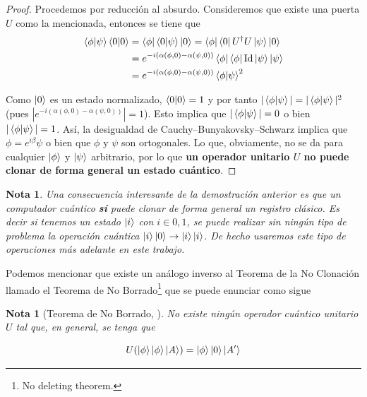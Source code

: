 \documentclass[11pt, spanish]{report}
\numberwithin{equation}{section}
\newtheorem{nota}[defin]{Nota}
\numberwithin{defin}{section}
\begin{document}
\begin{appendices}
\begin{proof}
Procedemos por reducción al absurdo. Consideremos que existe una puerta $U$ como la mencionada, entonces se tiene que
\begin{equation}
\begin{split}
\bra{\phi}\ket{\psi}\bra{0}\ket{0}&=\bra{\phi}\bra{0}\ket{\psi}\ket{0}=\bra{\phi}\bra{0} U^\dag U\ket{\psi}\ket{0} \\
&=e^{-i(\alpha(\phi,0)-\alpha(\psi,0))}\bra{\phi}\bra{\phi}\text{Id}\ket{\psi}\ket{\psi}\\
&=e^{-i(\alpha(\phi,0)-\alpha(\psi,0))}\bra{\phi}\ket{\psi}^2
\end{split}
\end{equation}

Como $\ket{0}$ es un estado normalizado, $\bra{0}\ket{0}=1$ y por tanto $|\bra{\phi}\ket{\psi}|=|\bra{\phi}\ket{\psi}|^2$ (pues $|e^{-i(\alpha(\phi,0)-\alpha(\psi,0))}|=1$). Esto implica que $|\bra{\phi}\ket{\psi}|=0$ o bien $|\bra{\phi}\ket{\psi}|=1$. Así, la desigualdad de Cauchy–Bunyakovsky–Schwarz implica que $\phi=e^{i\beta}\psi$ o bien que $\phi$ y $\psi$ son ortogonales. Lo que, obviamente, no se da para cualquier $\ket{\phi}$ y $\ket{\psi}$ arbitrario, por lo que \textbf{un operador unitario $U$ no puede clonar de forma general un estado cuántico}.
\end{proof}

\begin{nota}
Una consecuencia interesante de la demostración anterior es que un computador cuántico \textbf{sí} puede clonar de forma general un registro clásico. Es decir si tenemos un estado $\ket{i}$ con $i\in{0,1}$, se puede realizar sin ningún tipo de problema la operación cuántica $\ket{i}\ket{0}\rightarrow\ket{i}\ket{i}$. De hecho usaremos este tipo de operaciones más adelante en este trabajo.
\end{nota}

Podemos mencionar que existe un análogo inverso al Teorema de la No Clonación llamado el Teorema de No Borrado\footnote{No deleting theorem.} que se puede enunciar como sigue

\begin{nota}[Teorema de No Borrado, \cite{2000Natur.404..164K}] No existe ningún operador cuántico unitario $U$ tal que, en general, se tenga que

\begin{equation}
U(\ket{\phi}\ket{\phi}\ket{A})=\ket{\phi}\ket{0}\ket{A'}
\end{equation}
\end{nota}


\end{appendices}
\end{document}

